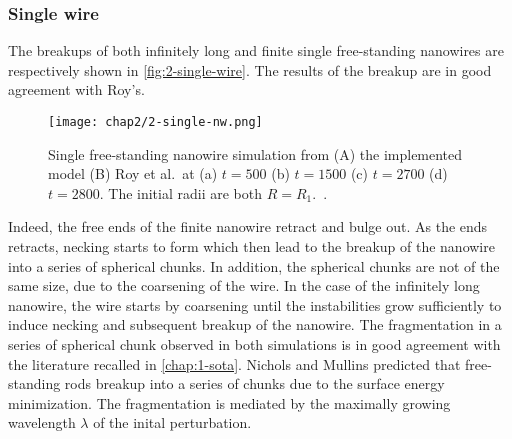     \subsubsection{Single wire}
    The breakups of both infinitely long and finite single free-standing nanowires are respectively shown in \autoref{fig:2-single-wire}. The results of the breakup are in good agreement with Roy's. 
    \begin{figure}[H]
        \centering
        \texttt{[image: chap2/2-single-nw.png]}
        \caption{Single free-standing nanowire simulation from (A) the implemented model (B) Roy et al.~at (a) $t=500$ (b) $t=1500$ (c) $t=2700$ (d) $t=2800$. The initial radii are both $R=R_1$.\ \cite{RoyVarmaGururajan2021}.}
        \label{fig:2-single-wire}
    \end{figure}
    Indeed, the free ends of the finite nanowire retract and bulge out. As the ends retracts, necking starts to form which then lead to the breakup of the nanowire into a series of spherical chunks. In addition, the spherical chunks are not of the same size, due to the coarsening of the wire. In the case of the infinitely long nanowire, the wire starts by coarsening until the instabilities grow sufficiently to induce necking and subsequent breakup of the nanowire.
    The fragmentation in a series of spherical chunk observed in both simulations is in good agreement with the literature recalled in \autoref{chap:1-sota}. Nichols and Mullins predicted that free-standing rods breakup into a series of chunks due to the surface energy minimization. The fragmentation is mediated by the maximally growing wavelength $\lambda$ of the inital perturbation.
